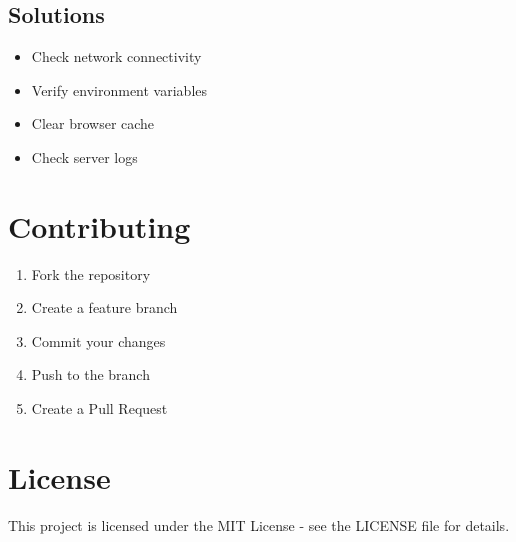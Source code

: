 \documentclass[12pt,a4paper]{article}
\begin{document}
\subsection{Solutions}
\begin{itemize}
    \item Check network connectivity
    \item Verify environment variables
    \item Clear browser cache
    \item Check server logs
\end{itemize}

\section{Contributing}
\begin{enumerate}
    \item Fork the repository
    \item Create a feature branch
    \item Commit your changes
    \item Push to the branch
    \item Create a Pull Request
\end{enumerate}

\section{License}
This project is licensed under the MIT License - see the LICENSE file for details.
\end{document}
